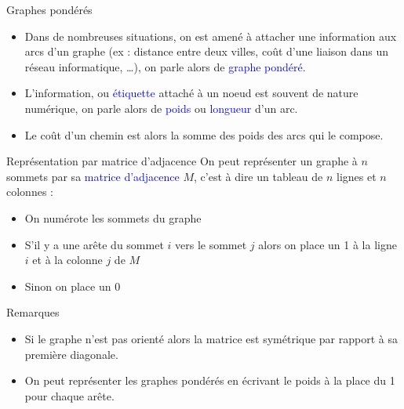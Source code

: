 \documentclass[10pt]{beamer}
\begin{document}
\begin{frame}[fragile]{\Ctitle}{\stitle}
	\begin{block}{Graphes pondérés}
		\begin{itemize}
			\item<1-> Dans de nombreuses situations, on est amené à attacher une information aux arcs d'un graphe (ex : distance entre deux villes, coût d'une liaison dans un réseau informatique, \dots), on parle alors de \textcolor{blue}{graphe pondéré}.
			\item<2-> L'information, ou \textcolor{blue}{étiquette} attaché à un noeud est souvent de nature numérique, on parle alors de \textcolor{blue}{poids} ou \textcolor{blue}{longueur} d'un arc.
				\item<3->Le coût d'un chemin est alors la somme des poids des arcs qui le compose.
		\end{itemize}
	\end{block}
\end{frame}

\begin{frame}[fragile]{\Ctitle}{\stitle}
	\begin{alertblock}{Représentation par matrice d'adjacence}
		On peut représenter un graphe à $n$ sommets par sa \textcolor{blue}{matrice d'adjacence} $M$, c'est à dire un tableau de $n$ lignes et $n$ colonnes :
		\begin{itemize}
			\item<2-> On numérote les sommets du graphe
			\item<3-> S'il y a une arête du sommet $i$ vers le sommet $j$ alors on place un 1 à la ligne $i$ et à la colonne $j$ de $M$
			\item<4-> Sinon on place un 0
		\end{itemize}
	\end{alertblock}
	\begin{block}{Remarques}
		\begin{itemize}
			\item<5-> Si le graphe n'est pas orienté alors la matrice est symétrique par rapport à sa première diagonale.
			\item<6-> On peut représenter les graphes pondérés en écrivant le poids à la place du 1 pour chaque arête.
		\end{itemize}
	\end{block}
\end{frame}
\end{document}

